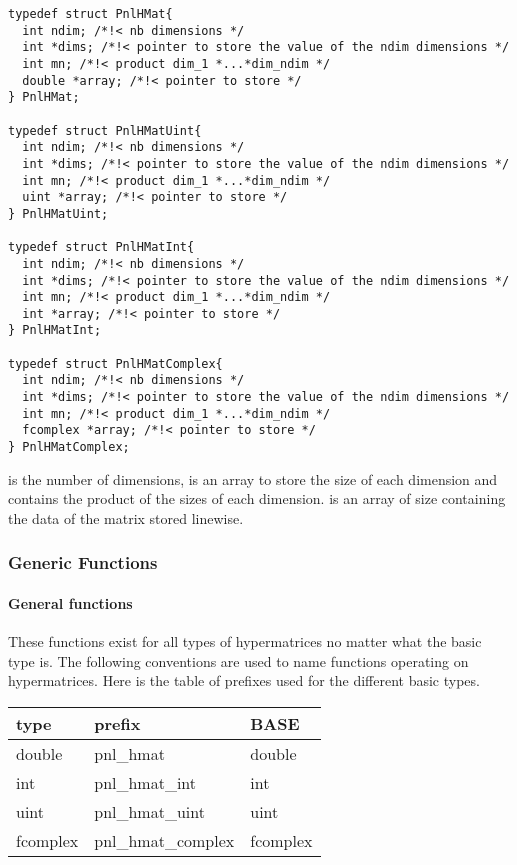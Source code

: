 \begin{verbatim}
typedef struct PnlHMat{
  int ndim; /*!< nb dimensions */ 
  int *dims; /*!< pointer to store the value of the ndim dimensions */ 
  int mn; /*!< product dim_1 *...*dim_ndim */
  double *array; /*!< pointer to store */
} PnlHMat;

typedef struct PnlHMatUint{
  int ndim; /*!< nb dimensions */ 
  int *dims; /*!< pointer to store the value of the ndim dimensions */ 
  int mn; /*!< product dim_1 *...*dim_ndim */
  uint *array; /*!< pointer to store */
} PnlHMatUint;

typedef struct PnlHMatInt{
  int ndim; /*!< nb dimensions */ 
  int *dims; /*!< pointer to store the value of the ndim dimensions */ 
  int mn; /*!< product dim_1 *...*dim_ndim */
  int *array; /*!< pointer to store */
} PnlHMatInt;

typedef struct PnlHMatComplex{
  int ndim; /*!< nb dimensions */ 
  int *dims; /*!< pointer to store the value of the ndim dimensions */ 
  int mn; /*!< product dim_1 *...*dim_ndim */
  fcomplex *array; /*!< pointer to store */
} PnlHMatComplex;
\end{verbatim}
 is the number of dimensions,  is an array to store the
size of each dimension and  contains the product of the sizes of each
dimension.  is an array of size  containing the data of the
matrix stored linewise.


\subsubsection{Generic Functions}
\paragraph{General functions}
These functions exist for all types of hypermatrices no matter what the basic type
is. The following conventions are used to name functions operating on hypermatrices.
Here is the table of prefixes used for the different basic types.

\begin{center}
  \begin{tabular}[t]{lll}
    type & prefix & BASE\\
    \hline
    double & pnl_hmat & double \\
    \hline
    int & pnl_hmat_int & int \\
    \hline
    uint & pnl_hmat_uint & uint\\
    \hline
    fcomplex & pnl_hmat_complex & fcomplex
  \end{tabular}
\end{center}

